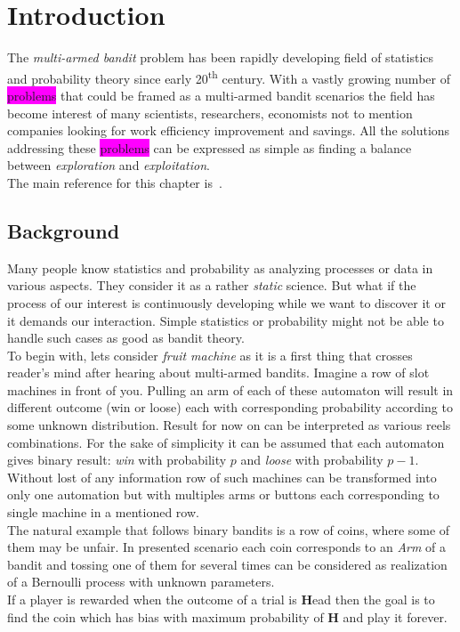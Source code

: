 \documentclass[12pt, a4paper, pdflatex, leqno]{report}
\newcommand{\ts}{\textsuperscript}
\begin{document}
\chapter{Introduction\label{chap:intro}}
The \emph{multi-armed bandit} problem has been rapidly developing field of statistics and probability theory since early 20\ts{th} century. With a vastly growing number of \colorbox{magenta}{problems} that could be framed as a multi-armed bandit scenarios the field has become interest of many scientists, researchers, economists not to mention companies looking for work efficiency improvement and savings. All the solutions addressing these \colorbox{magenta}{problems} can be expressed as simple as finding a balance between \emph{exploration} and \emph{exploitation}.\\

The main reference for this chapter is~\citep{berry+firstedt}.\\


\section{Background}
Many people know statistics and probability as analyzing processes or data in various aspects. They consider it as a rather \emph{static} science. But what if the process of our interest is continuously developing while we want to discover it or it demands our interaction. Simple statistics or probability might not be able to handle such cases as good as bandit theory.\\

To begin with, lets consider \emph{fruit machine} as it is a first thing that crosses reader's mind after hearing about multi-armed bandits. Imagine a row of slot machines in front of you. Pulling an arm of each of these automaton will result in different outcome (win or loose) each with corresponding probability according to some unknown distribution. Result for now on can be interpreted as various reels combinations. For the sake of simplicity it can be assumed that each automaton gives binary result: \emph{win} with probability $p$ and \emph{loose} with probability $p-1$. Without lost of any information row of such machines can be transformed into only one automation but with multiples arms or buttons each corresponding to single machine in a mentioned row.\\

The natural example that follows binary bandits is a row of coins, where some of them may be unfair. In presented scenario each coin corresponds to an \emph{Arm} of a bandit and tossing one of them for several times can be considered as realization of a Bernoulli process with unknown parameters.\\ If a player is rewarded when the outcome of a trial is \textbf{H}ead then the goal is to find the coin which has bias with maximum probability of \textbf{H} and play it forever.\\
\end{document}
